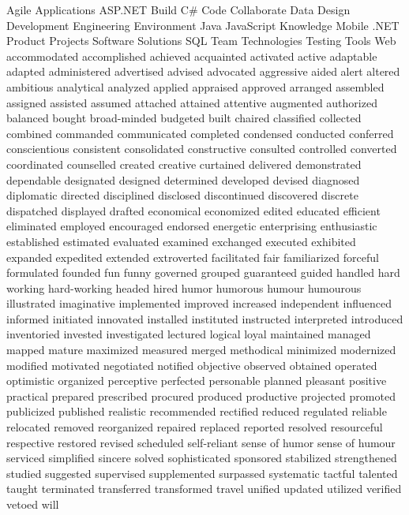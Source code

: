 \documentclass[]{friggeri-cv} %
\begin{document}


\keyword
{
Agile
Applications
ASP.NET
Build
C\#
Code
Collaborate
Data
Design
Development
Engineering
Environment
Java
JavaScript
Knowledge
Mobile
.NET
Product
Projects
Software
Solutions
SQL
Team
Technologies
Testing
Tools
Web
accommodated
accomplished
achieved
acquainted
activated
active
adaptable
adapted
administered
advertised
advised
advocated
aggressive
aided
alert
altered
ambitious
analytical
analyzed
applied
appraised
approved
arranged
assembled
assigned
assisted
assumed
attached
attained
attentive
augmented
authorized
balanced
bought
broad-minded
budgeted
built
chaired
classified
collected
combined
commanded
communicated
completed
condensed
conducted
conferred
conscientious
consistent
consolidated
constructive
consulted
controlled
converted
coordinated
counselled
created
creative
curtained
delivered
demonstrated
dependable
designated
designed
determined
developed
devised
diagnosed
diplomatic
directed
disciplined
disclosed
discontinued
discovered
discrete
dispatched
displayed
drafted
economical
economized
edited
educated
efficient
eliminated
employed
encouraged
endorsed
energetic
enterprising
enthusiastic
established
estimated
evaluated
examined
exchanged
executed
exhibited
expanded
expedited
extended
extroverted
facilitated
fair
familiarized
forceful
formulated
founded
fun
funny
governed
grouped
guaranteed
guided
handled
hard working
hard-working
headed
hired
humor
humorous
humour
humourous
illustrated
imaginative
implemented
improved
increased
independent
influenced
informed
initiated
innovated
installed
instituted
instructed
interpreted
introduced
inventoried
invested
investigated
lectured
logical
loyal
maintained
managed
mapped
mature
maximized
measured
merged
methodical
minimized
modernized
modified
motivated
negotiated
notified
objective
observed
obtained
operated
optimistic
organized
perceptive
perfected
personable
planned
pleasant
positive
practical
prepared
prescribed
procured
produced
productive
projected
promoted
publicized
published
realistic
recommended
rectified
reduced
regulated
reliable
relocated
removed
reorganized
repaired
replaced
reported
resolved
resourceful
respective
restored
revised
scheduled
self-reliant
sense of humor
sense of humour
serviced
simplified
sincere
solved
sophisticated
sponsored
stabilized
strengthened
studied
suggested
supervised
supplemented
surpassed
systematic
tactful
talented
taught
terminated
transferred
transformed
travel
unified
updated
utilized
verified
vetoed
will
}

\newpage
\end{document}

